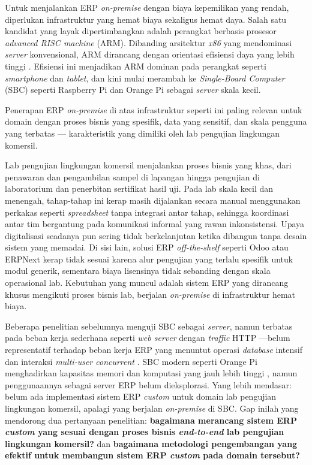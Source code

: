 Untuk menjalankan ERP \textit{on-premise} dengan biaya kepemilikan yang rendah, diperlukan infrastruktur yang hemat biaya sekaligus hemat daya. Salah satu kandidat yang layak dipertimbangkan adalah perangkat berbasis prosesor \textit{advanced RISC machine} (ARM). Dibanding arsitektur \textit{x86} yang mendominasi \textit{server} konvensional, ARM dirancang dengan orientasi efisiensi daya yang lebih tinggi \cite{blem2013power, aroca2012towards}. Efisiensi ini menjadikan ARM dominan pada perangkat seperti \textit{smartphone} dan \textit{tablet}, dan kini mulai merambah ke \textit{Single-Board Computer} (SBC) seperti Raspberry Pi dan Orange Pi sebagai \textit{server} skala kecil.

Penerapan ERP \textit{on-premise} di atas infrastruktur seperti ini paling relevan untuk domain dengan proses bisnis yang spesifik, data yang sensitif, dan skala pengguna yang terbatas — karakteristik yang dimiliki oleh lab pengujian lingkungan komersil.

Lab pengujian lingkungan komersil menjalankan proses bisnis yang khas, dari penawaran dan pengambilan sampel di lapangan hingga pengujian di laboratorium dan penerbitan sertifikat hasil uji. Pada lab skala kecil dan menengah, tahap-tahap ini kerap masih dijalankan secara manual menggunakan perkakas seperti \textit{spreadsheet} tanpa integrasi antar tahap, sehingga koordinasi antar tim bergantung pada komunikasi informal yang rawan inkonsistensi. Upaya digitalisasi seadanya pun sering tidak berkelanjutan ketika dibangun tanpa desain sistem yang memadai. Di sisi lain, solusi ERP \textit{off-the-shelf} seperti Odoo atau ERPNext kerap tidak sesuai karena alur pengujian yang terlalu spesifik untuk modul generik, sementara biaya lisensinya tidak sebanding dengan skala operasional lab. Kebutuhan yang muncul adalah sistem ERP yang dirancang khusus mengikuti proses bisnis lab, berjalan \textit{on-premise} di infrastruktur hemat biaya.

Beberapa penelitian sebelumnya menguji SBC sebagai \textit{server}, namun terbatas pada beban kerja sederhana seperti \textit{web server} dengan \textit{traffic} HTTP \cite{Putra2019}—belum representatif terhadap beban kerja ERP yang menuntut operasi \textit{database} intensif dan interaksi \textit{multi-user concurrent} \cite{maddodi2018generating}. SBC modern seperti Orange Pi menghadirkan kapasitas memori dan komputasi yang jauh lebih tinggi \cite{Ariza2022}, namun penggunaannya sebagai server ERP belum dieksplorasi. Yang lebih mendasar: belum ada implementasi sistem ERP \textit{custom} untuk domain lab pengujian lingkungan komersil, apalagi yang berjalan \textit{on-premise} di SBC. Gap inilah yang mendorong dua pertanyaan penelitian: \textbf{bagaimana merancang sistem ERP \textit{custom} yang sesuai dengan proses bisnis \textit{end-to-end} lab pengujian lingkungan komersil?} dan \textbf{bagaimana metodologi pengembangan yang efektif untuk membangun sistem ERP \textit{custom} pada domain tersebut?}

